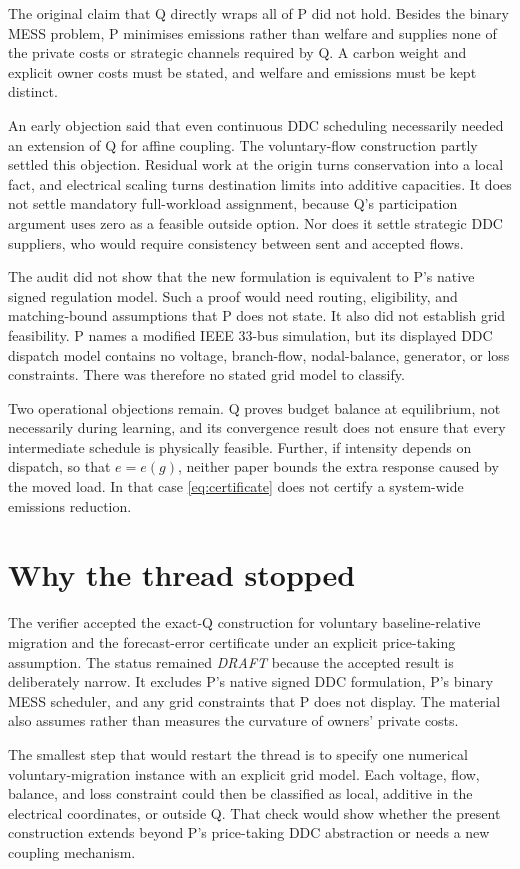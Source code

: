 \documentclass{article}
\begin{document}
The original claim that Q directly wraps all of P did not hold.  Besides the binary MESS problem, P minimises emissions rather than welfare and supplies none of the private costs or strategic channels required by Q.  A carbon weight and explicit owner costs must be stated, and welfare and emissions must be kept distinct.

An early objection said that even continuous DDC scheduling necessarily needed an extension of Q for affine coupling.  The voluntary-flow construction partly settled this objection.  Residual work at the origin turns conservation into a local fact, and electrical scaling turns destination limits into additive capacities.  It does not settle mandatory full-workload assignment, because Q's participation argument uses zero as a feasible outside option.  Nor does it settle strategic DDC suppliers, who would require consistency between sent and accepted flows.

The audit did not show that the new formulation is equivalent to P's native signed regulation model.  Such a proof would need routing, eligibility, and matching-bound assumptions that P does not state.  It also did not establish grid feasibility.  P names a modified IEEE 33-bus simulation, but its displayed DDC dispatch model contains no voltage, branch-flow, nodal-balance, generator, or loss constraints.  There was therefore no stated grid model to classify.

Two operational objections remain.  Q proves budget balance at equilibrium, not necessarily during learning, and its convergence result does not ensure that every intermediate schedule is physically feasible.  Further, if intensity depends on dispatch, so that $e=e(g)$, neither paper bounds the extra response caused by the moved load.  In that case \eqref{eq:certificate} does not certify a system-wide emissions reduction.

\section{Why the thread stopped}

The verifier accepted the exact-Q construction for voluntary baseline-relative migration and the forecast-error certificate under an explicit price-taking assumption.  The status remained \emph{DRAFT} because the accepted result is deliberately narrow.  It excludes P's native signed DDC formulation, P's binary MESS scheduler, and any grid constraints that P does not display.  The material also assumes rather than measures the curvature of owners' private costs.

The smallest step that would restart the thread is to specify one numerical voluntary-migration instance with an explicit grid model.  Each voltage, flow, balance, and loss constraint could then be classified as local, additive in the electrical coordinates, or outside Q.  That check would show whether the present construction extends beyond P's price-taking DDC abstraction or needs a new coupling mechanism.



\end{document}
